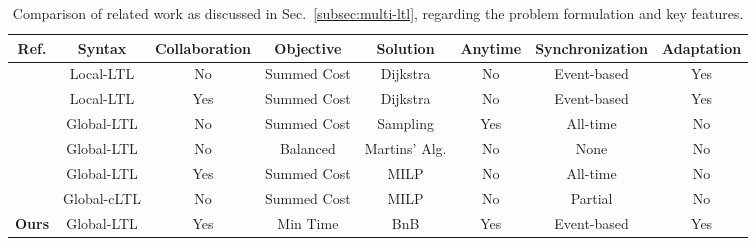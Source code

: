 \begin{table}[t]
  \begin{center}
    \caption{Comparison of related work as discussed in Sec.~\ref{subsec:multi-ltl},
  regarding the problem formulation and key features.}
\label{table:compare}
\begin{adjustbox}{width=0.8\linewidth}
{\def\arraystretch{1.2}\tabcolsep=3pt
\begin{tabular}{cccccccc}
\toprule
Ref. & Syntax & Collaboration & Objective  & Solution & Anytime & Synchronization & Adaptation \\ \midrule
\cite{guo2015multi, tumova2016multi} & Local-LTL & No & Summed Cost & Dijkstra & No & Event-based  & Yes\\
\cite{guo2016task} & Local-LTL & Yes & Summed Cost & Dijkstra &  No & Event-based  & Yes \\
\cite{kantaros2020stylus, luo2021abstraction} & Global-LTL & No & Summed Cost & Sampling & Yes & All-time & No \\
\cite{schillinger2018simultaneous} & Global-LTL & No & Balanced & Martins' Alg.  & No & None & No \\
\cite{luo2021temporal} & Global-LTL & Yes & Summed Cost & MILP & No & All-time & No \\
\cite{sahin2019multirobot, jones2019scratchs} & Global-cLTL & No & Summed Cost & MILP & No & Partial & No \\
\textbf{Ours} & Global-LTL & Yes & Min Time & BnB & Yes & Event-based & Yes \\
\bottomrule
\end{tabular}%
}
\end{adjustbox}
\end{center}
\end{table}

